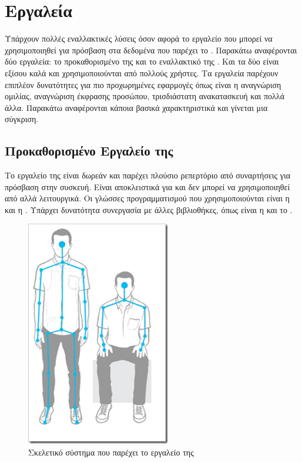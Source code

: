 \section{Εργαλεία}

Υπάρχουν πολλές εναλλακτικές λύσεις όσον αφορά το εργαλείο που μπορεί να χρησιμοποιηθεί για πρόσβαση στα δεδομένα που παρέχει το . Παρακάτω αναφέρονται δύο εργαλεία: το προκαθορισμένο  της  και το εναλλακτικό της . Και τα δύο είναι εξίσου καλά και χρησιμοποιούνται από πολλούς χρήστες. Τα εργαλεία παρέχουν επιπλέον δυνατότητες για πιο προχωρημένες εφαρμογές όπως είναι η αναγνώριση ομιλίας, αναγνώριση έκφρασης προσώπου, τρισδιάστατη ανακατασκευή και πολλά άλλα. Παρακάτω αναφέρονται κάποια βασικά χαρακτηριστικά και γίνεται μια σύγκριση.

\subsection{\texorpdfstring{Προκαθορισμένο Εργαλείο της }{}}

Το εργαλείο της  είναι δωρεάν και παρέχει πλούσιο ρεπερτόριο από συναρτήσεις για πρόσβαση στην συσκευή. Είναι αποκλειστικά για  και δεν μπορεί να χρησιμοποιηθεί από αλλά λειτουργικά. Οι γλώσσες προγραμματισμού που χρησιμοποιούνται είναι η  και η . Υπάρχει δυνατότητα συνεργασία με άλλες βιβλιοθήκες, όπως είναι η  και το .

\begin{figure}[H]
    \centering
    \includegraphics[height=.30\textheight, keepaspectratio]{fig/microsoft-skeleton.png}
    \caption{Σκελετικό σύστημα που παρέχει το εργαλείο της \protect\footnotemark}
    \label{fig:microsoft-sdk-skeleton}
\end{figure}

